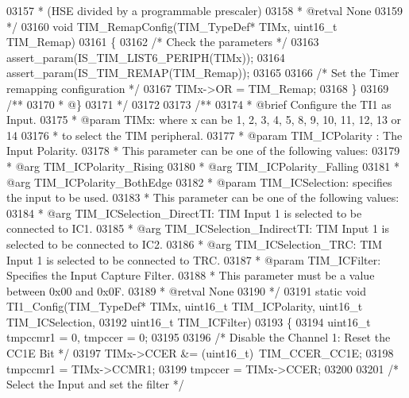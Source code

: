 \begin{DoxyCode}
03157 \textcolor{comment}{  *                                 (HSE divided by a programmable prescaler)  }
03158 \textcolor{comment}{  * @retval None}
03159 \textcolor{comment}{  */}
03160 \textcolor{keywordtype}{void} TIM_RemapConfig(TIM\_TypeDef* TIMx, uint16\_t TIM\_Remap)
03161 \{
03162  \textcolor{comment}{/* Check the parameters */}
03163   assert_param(IS\_TIM\_LIST6\_PERIPH(TIMx));
03164   assert_param(IS\_TIM\_REMAP(TIM\_Remap));
03165 
03166   \textcolor{comment}{/* Set the Timer remapping configuration */}
03167   TIMx->OR =  TIM\_Remap;
03168 \}
03169 \textcolor{comment}{/**}
03170 \textcolor{comment}{  * @\}}
03171 \textcolor{comment}{  */}
03172 
03173 \textcolor{comment}{/**}
03174 \textcolor{comment}{  * @brief  Configure the TI1 as Input.}
03175 \textcolor{comment}{  * @param  TIMx: where x can be 1, 2, 3, 4, 5, 8, 9, 10, 11, 12, 13 or 14 }
03176 \textcolor{comment}{  *         to select the TIM peripheral.}
03177 \textcolor{comment}{  * @param  TIM\_ICPolarity : The Input Polarity.}
03178 \textcolor{comment}{  *          This parameter can be one of the following values:}
03179 \textcolor{comment}{  *            @arg TIM\_ICPolarity\_Rising}
03180 \textcolor{comment}{  *            @arg TIM\_ICPolarity\_Falling}
03181 \textcolor{comment}{  *            @arg TIM\_ICPolarity\_BothEdge  }
03182 \textcolor{comment}{  * @param  TIM\_ICSelection: specifies the input to be used.}
03183 \textcolor{comment}{  *          This parameter can be one of the following values:}
03184 \textcolor{comment}{  *            @arg TIM\_ICSelection\_DirectTI: TIM Input 1 is selected to be connected to IC1.}
03185 \textcolor{comment}{  *            @arg TIM\_ICSelection\_IndirectTI: TIM Input 1 is selected to be connected to IC2.}
03186 \textcolor{comment}{  *            @arg TIM\_ICSelection\_TRC: TIM Input 1 is selected to be connected to TRC.}
03187 \textcolor{comment}{  * @param  TIM\_ICFilter: Specifies the Input Capture Filter.}
03188 \textcolor{comment}{  *          This parameter must be a value between 0x00 and 0x0F.}
03189 \textcolor{comment}{  * @retval None}
03190 \textcolor{comment}{  */}
03191 \textcolor{keyword}{static} \textcolor{keywordtype}{void} TI1_Config(TIM\_TypeDef* TIMx, uint16\_t TIM\_ICPolarity, uint16\_t TIM\_ICSelection,
03192                        uint16\_t TIM\_ICFilter)
03193 \{
03194   uint16\_t tmpccmr1 = 0, tmpccer = 0;
03195 
03196   \textcolor{comment}{/* Disable the Channel 1: Reset the CC1E Bit */}
03197   TIMx->CCER &= (uint16\_t)~TIM_CCER_CC1E;
03198   tmpccmr1 = TIMx->CCMR1;
03199   tmpccer = TIMx->CCER;
03200 
03201   \textcolor{comment}{/* Select the Input and set the filter */}

\end{DoxyCode}
